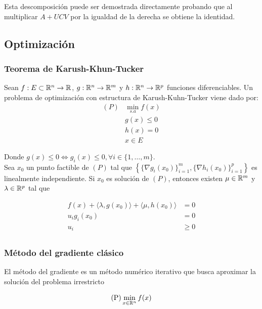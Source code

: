 Esta descomposición puede ser demostrada directamente probando que al multiplicar $A+UCV$ por la igualdad de la derecha se obtiene la identidad.

\subsection{Optimización}
\subsubsection{Teorema de Karush-Khun-Tucker}

Sean $f:E\subset\mathbb{R}^n\to\mathbb{R}$, $g:\mathbb{R}^n \to \mathbb{R}^m$ y $h:\mathbb{R}^n \to \mathbb{R}^p$ funciones diferenciables. Un problema de optimización con estructura de Karush-Kuhn-Tucker viene dado por:
\begin{equation}
	\begin{aligned}
		(P) & \min_{s.a} f(x)\\
		& g(x) \leq 0\\
		& h(x) = 0\\
		& x\in E
	\end{aligned}
\end{equation}
	

Donde $g(x) \leq 0\iff g_i(x)\leq 0,\forall i\in\{1,\ldots,m\}$.\\

Sea $x_0$ un punto factible de $(P)$ tal que $\left\{\{\nabla g_i(x_0)\}_{i=1}^m,\{\nabla h_i(x_0)\}_{i=1}^p\right\}$ es linealmente independiente. Si $x_0$ es solución de $(P)$, entonces existen $\mu\in\mathbb{R}^m$ y $\lambda\in\mathbb{R}^p$ tal que

\begin{equation}
	\begin{aligned}
		f(x) + \langle\lambda,g(x_0)\rangle + \langle\mu,h(x_0)\rangle &=0\\
		 u_i g_i(x_0) &= 0\\
		 u_i &\geq 0\\
	\end{aligned}
\end{equation}

\subsubsection{Método del gradiente clásico}

El método del gradiente es un método numérico iterativo que busca aproximar la solución del problema irrestricto

\begin{equation}
	\text{(P)} \min_{x\in \mathbb{R}^n} f(x)
\end{equation}

